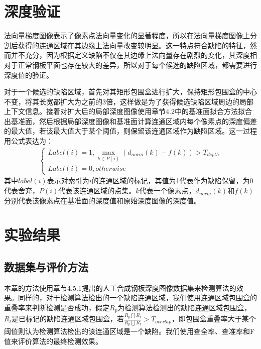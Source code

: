     \section{深度验证}
    法向量梯度图像表示了像素点法向量变化的显著程度，所以在法向量梯度图像上分割后获得的连通区域在其边缘上法向量改变较明显。这一特点符合缺陷的特征，然而并不充分，因为根据定义缺陷不仅在其边缘上法向量存在剧烈的变化，其深度相对于正常钢板平面也存在较大的差异，所以对于每个候选的缺陷区域，都需要进行深度值的验证。

    对于一个候选的缺陷区域，首先对其矩形包围盒进行扩大，保持矩形包围盒的中心不变，将其长宽都扩大为之前的3倍，这样做是为了获得候选缺陷区域周边的局部上下文信息。接着对扩大后的局部深度图像使用章节4.2中的基准面拟合方法拟合出基准面，然后根据局部深度图像和基准面计算连通区域内每个像素点的深度偏差的最大值，若该最大值大于某个阈值，则保留该连通区域作为缺陷区域。这一过程用公式表达为：
    \begin{eqnarray}
    \left\{ \begin{array}{l}
    Label\left( i \right) = 1,\mathop {\max }\limits_{k \in P\left( i \right)} \left( {{d_{norm}}\left( k \right) - f\left( k \right)} \right) > {T_{depth}}\\
    Label\left( i \right) = 0,otherwise
    \end{array} \right.
    \end{eqnarray}
    其中$label\left(i\right)$表示对索引为$i$的连通区域的标记，其值为1代表作为缺陷保留，为0代表舍弃，$P\left(i\right)$代表该连通区域的点集。$k$代表一个像素点，$d_{norm}\left(k\right)$和$f\left(k\right)$分别代表该像素点在基准面的深度值和原始深度图像的深度值。

    \section{实验结果}
        \subsection{数据集与评价方法}
        本章的方法使用章节4.5.1提出的人工合成钢板深度图像数据集来检测算法的效果。同样的，对于检测算法检出的一个缺陷连通区域，我们使用连通区域包围盒的重叠率来判断检测是否成功，假定$R_p$为检测算法检测出的缺陷连通区域包围盒，$R_t$是已标记的缺陷连通区域包围盒，若$\frac{{R_p}\bigcap{R_t}}{{R_p}\bigcup{R_t}}>T_{overlap}$，即包围盒重叠率大于某个阈值则认为检测算法检出的该连通区域是一个缺陷。我们使用查全率、查准率和F值来评价算法的最终检测效果。
